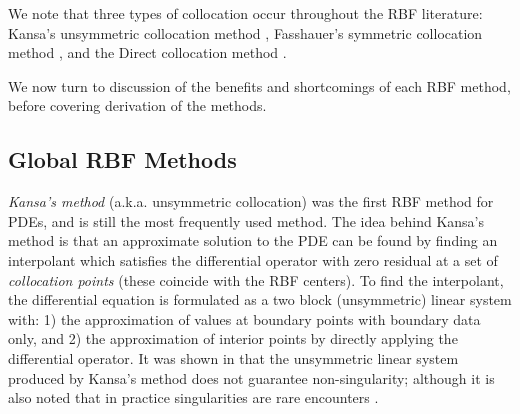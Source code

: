 \documentclass[11pt]{report}
\begin{document}
{We note that three types of collocation occur throughout the RBF literature: 
Kansa's unsymmetric collocation method \cite{Kansa1990a, Kansa1990b}, Fasshauer's symmetric collocation method \cite
{Fasshauer1997}, and the Direct collocation method \cite{Fedoseyev2002}. 


We now turn to discussion of the benefits and shortcomings of each RBF method, before covering derivation of the methods. 

\subsection{Global RBF Methods}

\emph{Kansa's method} \cite{Kansa1990a, Kansa1990b} (a.k.a. unsymmetric collocation) was the first RBF method for PDEs, and is still the most frequently used method. The idea behind Kansa's method is that an 
approximate solution to the PDE can be found by finding an interpolant which satisfies the differential operator with zero residual at a set of \emph{collocation points} (these coincide with the RBF centers). To find the interpolant, the differential equation is formulated as a two block (unsymmetric) linear system with: 1) the approximation of values 
at boundary 
points with boundary data only, and 2) the approximation of interior points by directly applying the differential operator. It was 
shown in \cite{Fasshauer1997, Hon2001} that the unsymmetric linear system produced by Kansa's method does not guarantee 
non-singularity; although it is also noted that in practice singularities are rare encounters \cite{Larsson2003}. 

}
\end{document}
